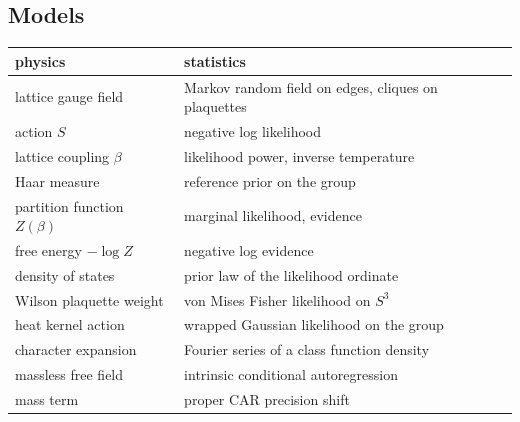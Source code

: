 \subsection{Models}
\begin{center}
\small
\begin{tabular}{p{1.95in}p{2.2in}}
\toprule
physics & statistics \\ \midrule
lattice gauge field & Markov random field on edges, cliques on plaquettes \\
action $S$ & negative log likelihood \\
lattice coupling $\beta$ & likelihood power, inverse temperature \\
Haar measure & reference prior on the group \\
partition function $Z(\beta)$ & marginal likelihood, evidence \\
free energy $-\log Z$ & negative log evidence \\
density of states & prior law of the likelihood ordinate \\
Wilson plaquette weight & von Mises Fisher likelihood on $S^3$ \\
heat kernel action & wrapped Gaussian likelihood on the group \\
character expansion & Fourier series of a class function density \\
massless free field & intrinsic conditional autoregression \\
mass term & proper CAR precision shift \\
\bottomrule
\end{tabular}
\end{center}

